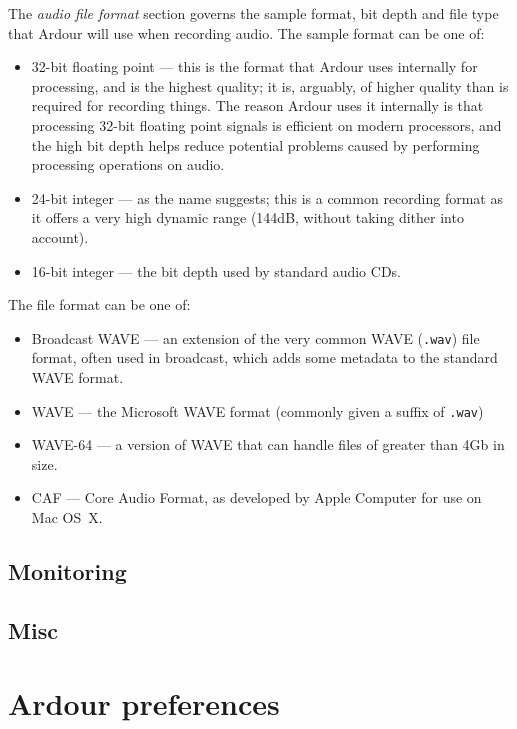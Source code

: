 \documentclass[10pt,a4paper]{book}
\begin{document}
{The \emph{audio file format} section governs the sample format, bit
depth and file type that Ardour will use when recording audio.  The
sample format can be one of:

\begin{itemize}
\item 32-bit floating point --- this is the format that Ardour uses
  internally for processing, and is the highest quality; it is,
  arguably, of higher quality than is required for recording things.
  The reason Ardour uses it internally is that processing 32-bit
  floating point signals is efficient on modern processors, and the
  high bit depth helps reduce potential problems caused by performing
  processing operations on audio.
\item 24-bit integer --- as the name suggests; this is a common
  recording format as it offers a very high dynamic range (144dB,
  without taking dither into account).
\item 16-bit integer --- the bit depth used by standard audio CDs.
\end{itemize}

The file format can be one of:

\begin{itemize}
\item Broadcast WAVE --- an extension of the very common WAVE
  (\texttt{.wav}) file format, often used in broadcast, which adds
  some metadata to the standard WAVE format.
\item WAVE --- the Microsoft WAVE format (commonly given a suffix of \texttt{.wav})
\item WAVE-64 --- a version of WAVE that can handle files of greater than 4Gb in size.
\item CAF --- Core Audio Format, as developed by Apple Computer for use on Mac OS~X.
\end{itemize}

\subsection{Monitoring}

\subsection{Misc}



\section{Ardour preferences}

}
\end{document}
